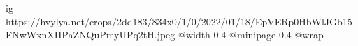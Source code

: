  
 
 
 
 

\ifcmt
  ig https://hvylya.net/crops/2dd183/834x0/1/0/2022/01/18/EpVERp0HbWlJGb15FNwWxnXIIPaZNQuPmyUPq2tH.jpeg
  @width 0.4
  @minipage 0.4
  @wrap \parpic[r]
\fi

